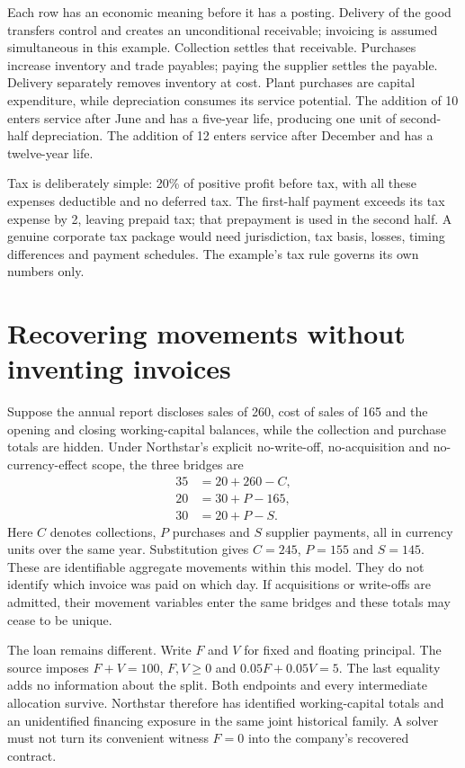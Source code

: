 Each row has an economic meaning before it has a posting. Delivery of the
good transfers control and creates an unconditional receivable; invoicing is
assumed simultaneous in this example. Collection settles that receivable.
Purchases increase inventory and trade payables; paying the supplier settles
the payable. Delivery separately removes inventory at cost. Plant purchases
are capital expenditure, while depreciation consumes its service potential.
The addition of 10 enters service after June and has a five-year life, producing
one unit of second-half depreciation. The addition of 12 enters service after
December and has a twelve-year life.

Tax is deliberately simple: 20\% of positive profit before tax, with all these
expenses deductible and no deferred tax. The first-half payment exceeds its
tax expense by 2, leaving prepaid tax; that prepayment is used in the second
half. A genuine corporate tax package would need jurisdiction, tax basis,
losses, timing differences and payment schedules. The example's tax rule
governs its own numbers only.

\section{Recovering movements without inventing invoices}

Suppose the annual report discloses sales of 260, cost of sales of 165 and the
opening and closing working-capital balances, while the collection and purchase
totals are hidden. Under Northstar's explicit no-write-off, no-acquisition and
no-currency-effect scope, the three bridges are
\begin{align}
35&=20+260-C,\label{eq:ns-ar}\\
20&=30+P-165,\\
30&=20+P-S.
\end{align}
Here $C$ denotes collections, $P$ purchases and $S$ supplier payments, all in
currency units over the same year. Substitution gives $C=245$, $P=155$ and
$S=145$. These are identifiable aggregate movements within this model. They do
not identify which invoice was paid on which day. If acquisitions or write-offs
are admitted, their movement variables enter the same bridges and these totals
may cease to be unique.

The loan remains different. Write $F$ and $V$ for fixed and floating principal.
The source imposes $F+V=100$, $F,V\geq0$ and
$0.05F+0.05V=5$. The last equality adds no information about the split.
Both endpoints and every intermediate allocation survive. Northstar therefore
has identified working-capital totals and an unidentified financing exposure
in the same joint historical family. A solver must not turn its convenient
witness $F=0$ into the company's recovered contract.

